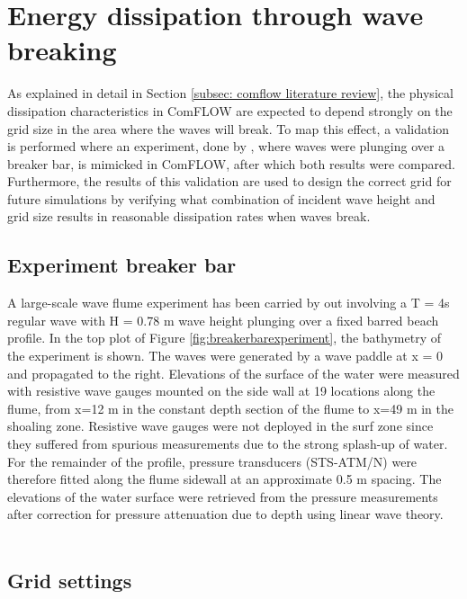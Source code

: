\section{Energy dissipation through wave breaking}
\label{sec: Dissipation}


As explained in detail in Section \ref{subsec: comflow literature review}, the physical dissipation characteristics in ComFLOW are expected to depend strongly on the grid size in the area where the waves will break. To map this effect, a validation is performed where an experiment, done by  \citet{breakerbarexperiment}, where waves were plunging over a breaker bar, is mimicked in ComFLOW, after which both results were compared. Furthermore, the results of this validation are used to design the correct grid for future simulations by verifying what combination of incident wave height and grid size results in reasonable dissipation rates when waves break.

\subsection{Experiment breaker bar}
A large-scale wave flume experiment has been carried by \citet{breakerbarexperiment} out involving a T = 4s regular wave with H = 0.78 m wave height plunging over a fixed barred beach profile. In the top plot of Figure \ref{fig:breakerbarexperiment}, the bathymetry of the experiment is shown. The waves were generated by a wave paddle at x = 0 and propagated to the right. Elevations of the surface of the water were measured with resistive wave gauges mounted on the side wall at 19 locations along the flume, from x=12 m in the constant depth section of the flume to x=49 m in the shoaling zone. Resistive wave gauges were not deployed in the surf zone since they suffered from spurious measurements due to the strong splash-up of water. For the remainder of the profile, pressure transducers (STS-ATM/N) were therefore fitted along the flume sidewall at an approximate 0.5 m spacing. The elevations of the water surface were retrieved from the pressure measurements after correction for pressure attenuation due to depth using linear wave theory. \\
\\


\subsection{Grid settings}

